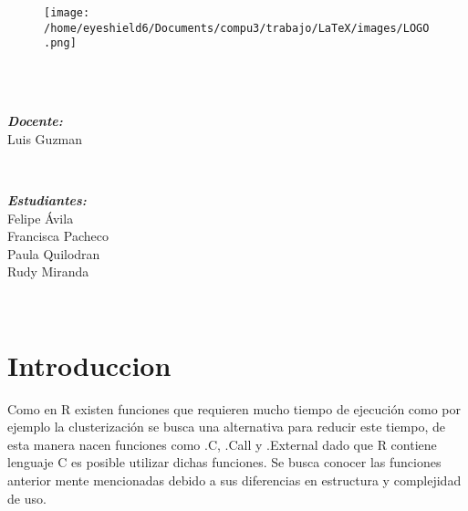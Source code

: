 \documentclass{article}
\begin{document}
    \begin{figure}
        \texttt{[image: /home/eyeshield6/Documents/compu3/trabajo/LaTeX/images/LOGO.png]}
    \end{figure}
    \begin{center}
        \\[0.2cm]
        \\[1cm]
        \begin{minipage}{0.4\textwidth}
            \begin{flushleft} \large
                \emph{\textbf{Docente:}}\\
                \textup{Luis Guzman}
            \end{flushleft}
        \end{minipage}
        ~
        \begin{minipage}{0.4\textwidth}
            \begin{flushright} \large
                \emph{\textbf{Estudiantes:}} \\
                \textup{Felipe \'Avila}\\
                \textup{Francisca Pacheco}\\
                \textup{Paula Quilodran}\\
                \textup{Rudy Miranda}
            \end{flushright}
        \end{minipage}\\[1cm]
        \makeatother
    \end{center}
    
    \tableofcontents

    \listoffigures

    \listoftables

    \section{Introduccion}
    
    Como en R existen funciones que requieren mucho tiempo de ejecución como por ejemplo la clusterización se busca una alternativa para reducir este tiempo, de esta manera nacen funciones como .C, .Call y .External dado que R contiene lenguaje C es posible utilizar dichas funciones.
    Se busca conocer las funciones anterior mente mencionadas debido a sus diferencias en estructura y complejidad de uso. 
\end{document}
